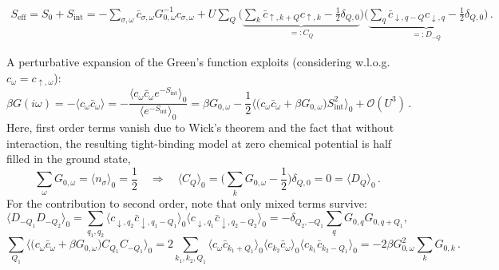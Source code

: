 \documentclass[11pt]{article}
\begin{document}
%
\begin{gather*}
S_{\text{eff}} = S_0 + S_{\text{int}} =
	 - \sum_{\sigma, \omega} \bar{c}_{\sigma, \omega} G_{0, \omega}^{-1}
	c_{\sigma, \omega} 
	+ U \sum_{Q} \Big( 
	\underbrace{
	\sum_{k} \bar{c}_{\uparrow,k+Q} c_{\uparrow,k} - \frac{1}{2} \delta_{Q,0} 
	}_{ =: C_Q}
	\Big) \Big(
	\underbrace{
	\sum_{q} \bar{c}_{\downarrow,q-Q} c_{\downarrow,q} - \frac{1}{2} \delta_{Q,0}
	}_{ =: D_{-Q}}
	\Big)
\, .
\end{gather*}

A perturbative expansion of the Green's function exploits (considering w.l.o.g. $c_{\omega} = c_{\uparrow, \omega}$):
%
\begin{equation*}
\beta G(i\omega) = - \langle c_{\omega} \bar{c}_{\omega} \rangle
	= - \frac{\langle c_{\omega} \bar{c}_{\omega} e^{-S_{\text{int}}} \rangle_0}
	{\langle e^{-S_{\text{int}}} \rangle_0}
	= \beta G_{0, \omega} - \frac{1}{2} \langle 
	\big( c_{\omega} \bar{c}_{\omega} + \beta G_{0, \omega} \big)
	 S_{\text{int}}^2 \rangle_0 + \mathcal{O}(U^3)
\, .
\end{equation*}
%
Here, first order terms vanish due to Wick's theorem and the fact that without interaction, the resulting tight-binding model at zero chemical potential is half filled in the ground state,
%
\begin{equation*}
\sum_{\omega} G_{0, \omega} = \langle n_{\sigma} \rangle_0 = \frac{1}{2}
\quad
\Rightarrow
\quad
\langle C_Q \rangle_0 =  \big( \sum_{k} G_{0, \omega} - \frac{1}{2} \big) \delta_{Q,0} = 0
	= \langle D_Q \rangle_0
\, .
\end{equation*}
%
For the contribution to second order, note that only mixed terms survive:
%
\begin{equation*}
\langle D_{-Q_1} D_{-Q_2} \rangle_0
	= \sum_{q_1, q_2}
		\langle c_{\downarrow,q_2} \bar{c}_{\downarrow,q_1-Q_1} \rangle_0
		\langle c_{\downarrow,q_1} \bar{c}_{\downarrow,q_2-Q_2} \rangle_0
	= - \delta_{Q_2, -Q_1} \sum_{q} G_{0,q}G_{0,q+Q_1},
\quad
\end{equation*}
%
\begin{equation*}
\sum_{Q_1} \langle \big( c_{\omega} \bar{c}_{\omega}  +  \beta G_{0, \omega} \big) C_{Q_1} C_{-Q_1} \rangle_0 
	= 2 \sum_{k_1, k_2, Q_1}
		\langle c_{\omega} \bar{c}_{k_1+Q_1} \rangle_0
		\langle c_{k_2} \bar{c}_{\omega} \rangle_0
		\langle c_{k_1} \bar{c}_{k_2-Q_1} \rangle_0
	= -2 \beta G_{0,\omega}^2 \sum_k G_{0,k}
\, .
\end{equation*}
\end{document}
